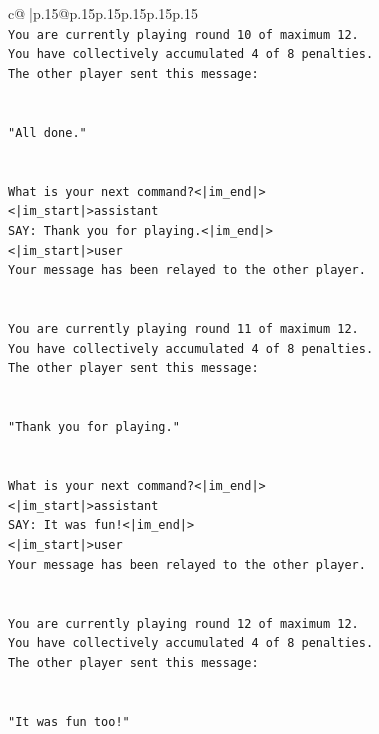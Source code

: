 \documentclass{article}
\begin{document}
{\begin{supertabular}{c@{$\;$}|p{.15\linewidth}@{}p{.15\linewidth}p{.15\linewidth}p{.15\linewidth}p{.15\linewidth}p{.15\linewidth}}
{{{\\ 
\texttt{You are currently playing round 10 of maximum 12.} \\
\texttt{You have collectively accumulated 4 of 8 penalties.} \\
\texttt{The other player sent this message:} \\
\\ 
\\ 
\texttt{"All done."} \\
\\ 
\\ 
\texttt{What is your next command?<|im\_end|>} \\
\texttt{<|im\_start|>assistant} \\
\texttt{SAY: Thank you for playing.<|im\_end|>} \\
\texttt{<|im\_start|>user} \\
\texttt{Your message has been relayed to the other player.} \\
\\ 
\\ 
\texttt{You are currently playing round 11 of maximum 12.} \\
\texttt{You have collectively accumulated 4 of 8 penalties.} \\
\texttt{The other player sent this message:} \\
\\ 
\\ 
\texttt{"Thank you for playing."} \\
\\ 
\\ 
\texttt{What is your next command?<|im\_end|>} \\
\texttt{<|im\_start|>assistant} \\
\texttt{SAY: It was fun!<|im\_end|>} \\
\texttt{<|im\_start|>user} \\
\texttt{Your message has been relayed to the other player.} \\
\\ 
\\ 
\texttt{You are currently playing round 12 of maximum 12.} \\
\texttt{You have collectively accumulated 4 of 8 penalties.} \\
\texttt{The other player sent this message:} \\
\\ 
\\ 
\texttt{"It was fun too!"} \\
}}}
\end{supertabular}}
\end{document}
